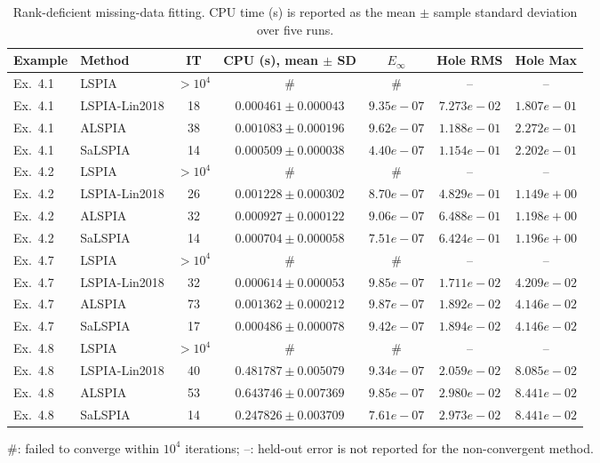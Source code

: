 \begin{table}[H]
\centering
\scriptsize
\caption{Rank-deficient missing-data fitting. CPU time (s) is reported as the mean $\pm$ sample standard deviation over five runs.}
\label{tab:rank_deficient}
\begin{tabular}{llccccc}
\hline
Example & Method & IT & CPU (s), mean $\pm$ SD & $E_\infty$ & Hole RMS & Hole Max \\
\hline
Ex.~4.1 & LSPIA & $>10^4$ & \# & \# & -- & -- \\
Ex.~4.1 & LSPIA-Lin2018 & 18 & $0.000461 \pm 0.000043$ & $9.35e-07$ & $7.273e-02$ & $1.807e-01$ \\
Ex.~4.1 & ALSPIA & 38 & $0.001083 \pm 0.000196$ & $9.62e-07$ & $1.188e-01$ & $2.272e-01$ \\
Ex.~4.1 & SaLSPIA & 14 & $0.000509 \pm 0.000038$ & $4.40e-07$ & $1.154e-01$ & $2.202e-01$ \\
\hline
Ex.~4.2 & LSPIA & $>10^4$ & \# & \# & -- & -- \\
Ex.~4.2 & LSPIA-Lin2018 & 26 & $0.001228 \pm 0.000302$ & $8.70e-07$ & $4.829e-01$ & $1.149e+00$ \\
Ex.~4.2 & ALSPIA & 32 & $0.000927 \pm 0.000122$ & $9.06e-07$ & $6.488e-01$ & $1.198e+00$ \\
Ex.~4.2 & SaLSPIA & 14 & $0.000704 \pm 0.000058$ & $7.51e-07$ & $6.424e-01$ & $1.196e+00$ \\
\hline
Ex.~4.7 & LSPIA & $>10^4$ & \# & \# & -- & -- \\
Ex.~4.7 & LSPIA-Lin2018 & 32 & $0.000614 \pm 0.000053$ & $9.85e-07$ & $1.711e-02$ & $4.209e-02$ \\
Ex.~4.7 & ALSPIA & 73 & $0.001362 \pm 0.000212$ & $9.87e-07$ & $1.892e-02$ & $4.146e-02$ \\
Ex.~4.7 & SaLSPIA & 17 & $0.000486 \pm 0.000078$ & $9.42e-07$ & $1.894e-02$ & $4.146e-02$ \\
\hline
Ex.~4.8 & LSPIA & $>10^4$ & \# & \# & -- & -- \\
Ex.~4.8 & LSPIA-Lin2018 & 40 & $0.481787 \pm 0.005079$ & $9.34e-07$ & $2.059e-02$ & $8.085e-02$ \\
Ex.~4.8 & ALSPIA & 53 & $0.643746 \pm 0.007369$ & $9.85e-07$ & $2.980e-02$ & $8.441e-02$ \\
Ex.~4.8 & SaLSPIA & 14 & $0.247826 \pm 0.003709$ & $7.61e-07$ & $2.973e-02$ & $8.441e-02$ \\
\hline
\end{tabular}
\par\smallskip
\parbox{0.95\textwidth}{\footnotesize \#: failed to converge within $10^4$ iterations; --: held-out error is not reported for the non-convergent method.}
\end{table}
